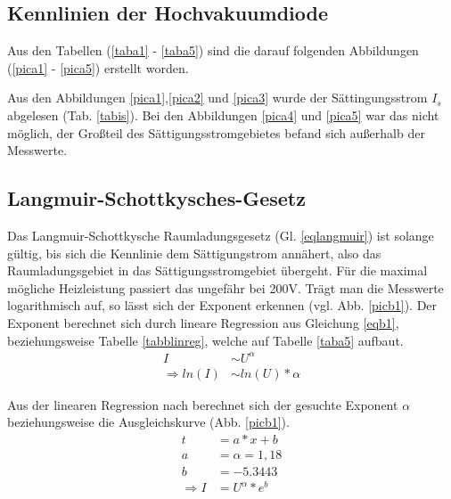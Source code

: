 \subsection{Kennlinien der Hochvakuumdiode} 
Aus den Tabellen (\ref{taba1} - \ref{taba5}) sind die darauf folgenden 
Abbildungen (\ref{pica1} - \ref{pica5}) erstellt worden.
    
     
Aus den Abbildungen \ref{pica1},\ref{pica2} und \ref{pica3} wurde der Sättingungsstrom 
$I_s$ abgelesen (Tab. \ref{tabis}). Bei den Abbildungen \ref{pica4} und \ref{pica5} war das 
nicht möglich, der Großteil des Sättigungsstromgebietes befand sich außerhalb der 
Messwerte.

\FloatBarrier
\subsection{Langmuir-Schottkysches-Gesetz}
Das Langmuir-Schottkysche Raumladungsgesetz (Gl. \ref{eqlangmuir}) ist solange gültig, bis sich die Kennlinie
dem Sättigungstrom annähert, also das Raumladungsgebiet in das Sättigungsstromgebiet 
übergeht. Für die maximal mögliche Heizleistung passiert das ungefähr bei 200V.
Trägt man die Messwerte logarithmisch auf, so lässt sich der Exponent erkennen (vgl. 
Abb. \ref{picb1}). Der Exponent berechnet sich durch lineare Regression \cite{linreg}
aus Gleichung \ref{eqb1}, beziehungsweise Tabelle \ref{tabblinreg}, welche auf Tabelle \ref{taba5} aufbaut.
\begin{align}
I&\sim U^\alpha \\
\Rightarrow ln(I)&\sim ln(U)*\alpha \label{eqb1}
\end{align}

\FloatBarrier
Aus der linearen Regression nach \cite{linreg} berechnet sich der gesuchte Exponent $\alpha$ beziehungsweise die Ausgleichskurve (Abb. \ref{picb1}).
\begin{align}
t&=a*x+b \\
a&=\alpha=1,18 \\
b&=-5.3443 \\
\Rightarrow I&=U^\alpha*e^b 
\end{align}

\FloatBarrier
